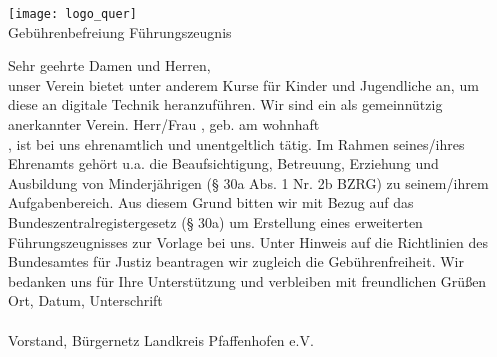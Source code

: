 \documentclass[a4paper,12pt]{article}
\newcommand{\UnderlinedField}[3][]{\TextField[name=#2,width=#3,bordercolor=black,borderstyle=U,#1]{}}
\begin{document}
\begin{imagetextbox}[]{8cm}{3mm}
	\texttt{[image: logo\_quer]} \\
	\tcblower
	\vspace{0.5cm}
	Gebührenbefreiung Führungszeugnis
\end{imagetextbox}

\begin{Form} %

\vspace{4em}

Sehr geehrte Damen und Herren, \\

unser Verein bietet unter anderem Kurse für Kinder und Jugendliche an, um diese an digitale Technik heranzuführen. Wir sind ein als gemeinnützig anerkannter Verein. Herr/Frau \UnderlinedField{lastName}{0.3\textwidth}, geb. am \UnderlinedField{birthday}{0.3\textwidth} wohnhaft \\ \UnderlinedField{address}{0.8\textwidth}, ist bei uns ehrenamtlich und unentgeltlich tätig. Im Rahmen seines/ihres Ehrenamts gehört u.a. die Beaufsichtigung, Betreuung, Erziehung und Ausbildung von Minder­jährigen (§ 30a Abs. 1 Nr. 2b BZRG) zu seinem/ihrem Aufgabenbereich. Aus diesem Grund bitten wir mit Bezug auf das Bundeszentralregistergesetz (§ 30a) um Erstellung eines erweiterten Führungszeugnisses zur Vorlage bei uns. Unter Hinweis auf die Richtlinien des Bundesamtes für Justiz beantragen wir zugleich die Gebührenfreiheit. Wir bedanken uns für Ihre Unterstützung und verbleiben mit freundlichen Grüßen \\

Ort, Datum, Unterschrift \\

\UnderlinedField[height=1cm,readonly]{signature}{0.5\textwidth} \\
Vorstand, Bürgernetz Landkreis Pfaffenhofen e.V.



\end{Form}
\end{document}
